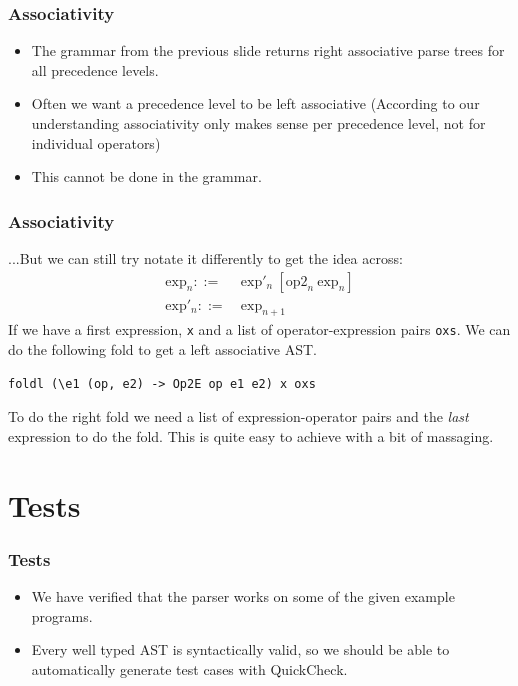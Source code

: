 \documentclass{beamer}
\begin{document}
\begin{frame}[fragile]
\frametitle{Associativity}
\begin{itemize}
\item The grammar from the previous slide returns right associative parse trees for all precedence levels.
\item Often we want a precedence level to be left associative (According to our understanding associativity only makes sense per precedence level, not for individual operators)
\item This cannot be done in the grammar.
\end{itemize}
\end{frame}
\begin{frame}[fragile]
\frametitle{Associativity}
...But we can still try notate it differently to get the idea across:
\begin{align*}
\text{exp}_n ::=&\ \text{exp}'_n\ [ \text{op2}_n\ \text{exp}_n ] \\
\text{exp}'_n ::=&\ \text{exp}_{n+1} 
\end{align*}
If we have a first expression, \lstinline{x} and a list of operator-expression pairs \lstinline{oxs}. We can do the following fold to get a left associative AST.
\begin{lstlisting}
foldl (\e1 (op, e2) -> Op2E op e1 e2) x oxs
\end{lstlisting}

To do the right fold we need a list of expression-operator pairs and the \emph{last} expression to do the fold. This is quite easy to achieve with a bit of massaging. 
\end{frame}

\section{Tests}
\begin{frame}
\frametitle{Tests}

\begin{itemize}
\item We have verified that the parser works on some of the given example programs.
\item Every well typed AST is syntactically valid, so we should be able to automatically generate test cases with QuickCheck.
\end{itemize}

\end{frame}
\end{document}
